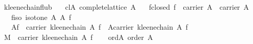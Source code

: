\begin{isabellebody}
\endisatagproof
{\isafoldproof}%
%
\isadelimproof
\isanewline
%
\endisadelimproof
\isanewline
{}\isamarkupfalse%
\ kleene{}chain{}f{}lub{}\isanewline
\ \ \ cl{}A{}\ {}complete{}lattice\ A{}\isanewline
\ \ \ f{}closed{}\ {}f\ {}\ carrier\ A\ {}\ carrier\ A{}\isanewline
\ \ \ f{}iso{}\ {}isotone\ A\ A\ f{}\isanewline
\ \ \ {}{}\isactrlbsub Af\ {}\ carrier\ {}kleene{}chain\ A\ f{}{}\ {}\ {}\isactrlbsub Acarrier\ {}kleene{}chain\ A\ f{}{}{}\isanewline
%
\isadelimproof
%
\endisadelimproof
%
\isatagproof
{}\isamarkupfalse%
\ {}\isanewline
\ \ \isamarkupfalse%
\ {}M\ {}\ {}carrier\ {}kleene{}chain\ A\ f{}{}\isanewline
\isanewline
\ \ \isamarkupfalse%
\ ord{}A{}\ {}order\ A{}\isanewline

\end{isabellebody}
